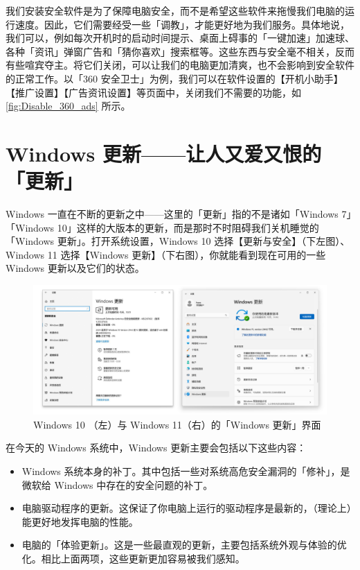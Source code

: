 我们安装安全软件是为了保障电脑安全，而不是希望这些软件来拖慢我们电脑的运行速度。因此，它们需要经受一些「调教」，才能更好地为我们服务。具体地说，我们可以，例如每次开机时的启动时间提示、桌面上碍事的「一键加速」加速球、各种「资讯」弹窗广告和「猜你喜欢」搜索框等。这些东西与安全毫不相关，反而有些喧宾夺主。将它们关闭，可以让我们的电脑更加清爽，也不会影响到安全软件的正常工作。以「360 安全卫士」为例，我们可以在软件设置的【开机小助手】【推广设置】【广告资讯设置】等页面中，关闭我们不需要的功能，如\autoref{fig:Disable_360_ads} 所示。

\section{Windows 更新——让人又爱又恨的「更新」}

Windows 一直在不断的更新之中——这里的「更新」指的不是诸如「Windows 7」「Windows 10」这样的大版本的更新，而是那时不时阻碍我们关机睡觉的「Windows 更新」。打开系统设置，Windows 10 选择【更新与安全】（下左图）、Windows 11 选择【Windows 更新】（下右图），你就能看到现在可用的一些 Windows 更新以及它们的状态。

\begin{figure}[htb!]
  \centering
  \includegraphics[width=.85\textwidth]{assets/basic/Update.png}
  \caption{Windows 10 （左）与 Windows 11（右）的「Windows 更新」界面}
  \label{Windows_Update}
\end{figure}

在今天的 Windows 系统中，Windows 更新主要会包括以下这些内容：

\begin{itemize}
  \item Windows 系统本身的补丁。其中包括一些对系统高危安全漏洞的「修补」，是微软给 Windows 中存在的安全问题的补丁。
  \item 电脑驱动程序的更新。这保证了你电脑上运行的驱动程序是最新的，（理论上）能更好地发挥电脑的性能。
  \item 电脑的「体验更新」。这是一些最直观的更新，主要包括系统外观与体验的优化。相比上面两项，这些更新更加容易被我们感知。
\end{itemize}


